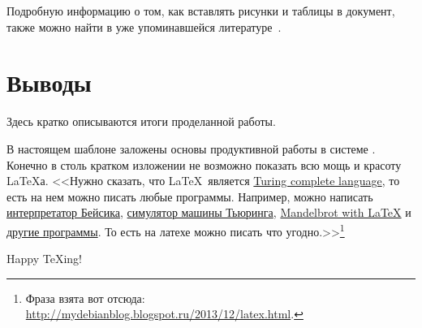 Подробную информацию о том, как вставлять рисунки и таблицы в документ, также можно найти в уже упоминавшейся литературе~\cite{latex:b1,latex:b2,latex:b3}. 

\section{Выводы}
Здесь кратко описываются итоги проделанной работы.

В настоящем шаблоне заложены основы продуктивной работы в системе \LaTeXe.  Конечно в столь кратком изложении не возможно показать всю мощь и красоту \LaTeX{а}. 
<<Нужно сказать, что \LaTeX\ является \href{https://ru.wikipedia.org/wiki/%D0%9F%D0%BE%D0%BB%D0%BD%D0%BE%D1%82%D0%B0_%D0%BF%D0%BE_%D0%A2%D1%8C%D1%8E%D1%80%D0%B8%D0%BD%D0%B3%D1%83}{Turing complete language}, то есть на нем можно писать любые программы. Например, можно написать \href{http://tug.org/TUGboat/tb11-3/tb29greene.pdf}{интерпретатор Бейсика}, \href{http://en.literateprograms.org/Turing_machine_simulator_%28LaTeX%29}{симулятор машины Тьюринга}, 
\href{http://www.thole.org/manfred/apfel/}{Mandelbrot with LaTeX} и \href{http://stackoverflow.com/questions/2968411/ive-heard-that-latex-is-turing-complete-are-there-any-programs-written-in-late}{другие программы}. То есть на латехе можно писать что угодно.>>\footnote{Фраза взята вот отсюда: \url{http://mydebianblog.blogspot.ru/2013/12/latex.html}.}

\vfill
\centerline{\Huge Happy \TeX{ing}!}
\vfill
